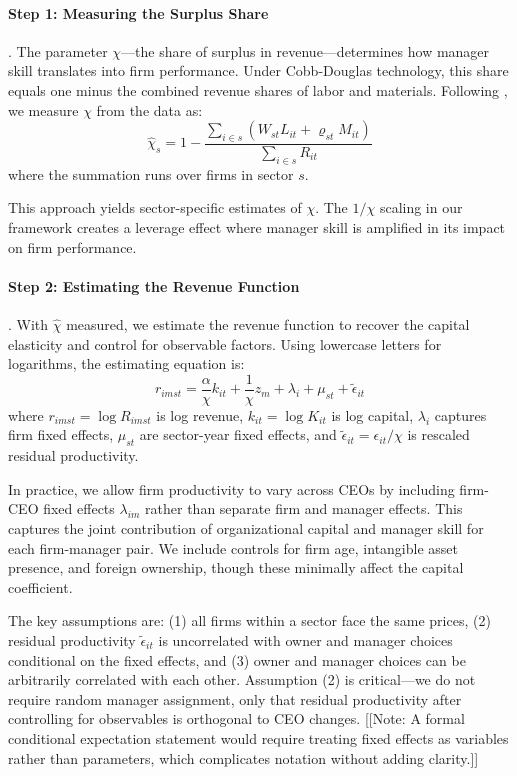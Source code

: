 \documentclass[11pt,a4paper]{article}
\begin{document}
\paragraph{Step 1: Measuring the Surplus Share}. The parameter $\chi$—the share of surplus in revenue—determines how manager skill translates into firm performance. Under Cobb-Douglas technology, this share equals one minus the combined revenue shares of labor and materials. Following \citet{Gandhi2020-nu}, we measure $\chi$ from the data as:
\begin{equation}
\hat{\chi}_s = 1 - \frac{\sum_{i \in s}(W_{st}L_{it} + \varrho_{st}M_{it})}{\sum_{i \in s} R_{it}}
\end{equation}
where the summation runs over firms in sector $s$.

This approach yields sector-specific estimates of $\chi$. The $1/\chi$ scaling in our framework creates a leverage effect where manager skill is amplified in its impact on firm performance.

\paragraph{Step 2: Estimating the Revenue Function}. With $\hat{\chi}$ measured, we estimate the revenue function to recover the capital elasticity and control for observable factors. Using lowercase letters for logarithms, the estimating equation is:
\begin{equation}
r_{imst} = \frac{\alpha}{\chi} k_{it} + \frac{1}{\chi}z_m + \lambda_i + \mu_{st} + \tilde{\epsilon}_{it}
\end{equation}
where $r_{imst} = \log R_{imst}$ is log revenue, $k_{it} = \log K_{it}$ is log capital, $\lambda_i$ captures firm fixed effects, $\mu_{st}$ are sector-year fixed effects, and $\tilde{\epsilon}_{it} = \epsilon_{it}/\chi$ is rescaled residual productivity.

In practice, we allow firm productivity to vary across CEOs by including firm-CEO fixed effects $\lambda_{im}$ rather than separate firm and manager effects. This captures the joint contribution of organizational capital and manager skill for each firm-manager pair. We include controls for firm age, intangible asset presence, and foreign ownership, though these minimally affect the capital coefficient.

The key assumptions are: (1) all firms within a sector face the same prices, (2) residual productivity $\tilde{\epsilon}_{it}$ is uncorrelated with owner and manager choices conditional on the fixed effects, and (3) owner and manager choices can be arbitrarily correlated with each other. Assumption (2) is critical—we do not require random manager assignment, only that residual productivity after controlling for observables is orthogonal to CEO changes. [[Note: A formal conditional expectation statement would require treating fixed effects as variables rather than parameters, which complicates notation without adding clarity.]]
\end{document}
